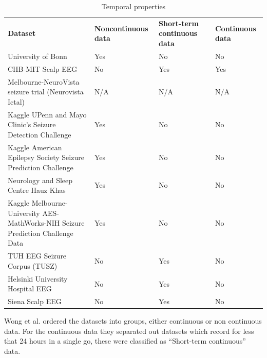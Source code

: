 \documentclass[12pt]{article}
\begin{document}
\begin{table}[H]
\centering
\begin{tabular}{p{}p{}p{}p{}}
  \textbf{Dataset} &
  \textbf{Noncontinuous data} &
  \textbf{Short-term continuous data} &
  \textbf{Continuous data} \\
  
University of Bonn                                                              & Yes & No  & No  \\
CHB-MIT Scalp EEG                                                               & No  & Yes & Yes \\
Melbourne-NeuroVista seizure trial (Neurovista Ictal)                           & N/A & N/A & N/A \\
Kaggle UPenn and Mayo Clinic's Seizure Detection Challenge                      & Yes & No  & No  \\
Kaggle American Epilepsy Society Seizure Prediction Challenge                   & Yes & No  & No  \\
Neurology and Sleep Centre Hauz Khas                                            & Yes & No  & No  \\
Kaggle Melbourne-University AES-MathWorks-NIH Seizure Prediction Challenge Data & Yes & No  & No  \\
TUH EEG Seizure Corpus (TUSZ)                                                   & No  & Yes & No  \\
Helsinki University Hospital EEG                                                & No  & Yes & No  \\
Siena Scalp EEG                                                                 & No  & Yes & No 
\end{tabular}
\caption{Temporal properties}
\end{table}

Wong et al. ordered the datasets into groups, either continuous or non continuous data. For the continuous data they separated out datasets which record for less that 24 hours in a single go, these were classified as ``Short-term continuous'' data.
\end{document}
